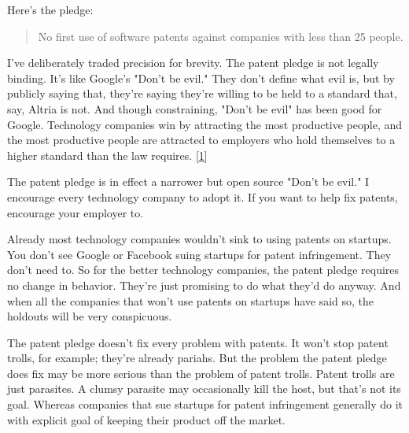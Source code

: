 Here's the
                  pledge:
                  \begin{quote}

                    No first use of software patents against companies with less
                    than 25 people.
                  
\end{quote}

                  I've deliberately traded precision for brevity. The patent
                  pledge is not legally binding. It's like Google's "Don't be
                  evil." They don't define what evil is, but by publicly saying
                  that, they're saying they're willing to be held to a standard
                  that, say, Altria is not. And though constraining, "Don't be
                  evil" has been good for Google. Technology companies win by
                  attracting the most productive people, and the most productive
                  people are attracted to employers who hold themselves to a
                  higher standard than the law requires.
                  [\href{\#f1n}{1}]

The patent pledge is in effect a narrower but
                  open source "Don't be evil." I encourage every technology
                  company to adopt it. If you want to help fix patents,
                  encourage your employer to.

Already most technology
                  companies wouldn't sink to using patents on startups. You
                  don't see Google or Facebook suing startups for patent
                  infringement. They don't need to. So for the better technology
                  companies, the patent pledge requires no change in behavior.
                  They're just promising to do what they'd do anyway. And when
                  all the companies that won't use patents on startups have said
                  so, the holdouts will be very conspicuous.

The
                  patent pledge doesn't fix every problem with patents. It won't
                  stop patent trolls, for example; they're already pariahs. But
                  the problem the patent pledge does fix may be more serious
                  than the problem of patent trolls. Patent trolls are just
                  parasites. A clumsy parasite may occasionally kill the host,
                  but that's not its goal. Whereas companies that sue startups
                  for patent infringement generally do it with explicit goal of
                  keeping their product off the market.

